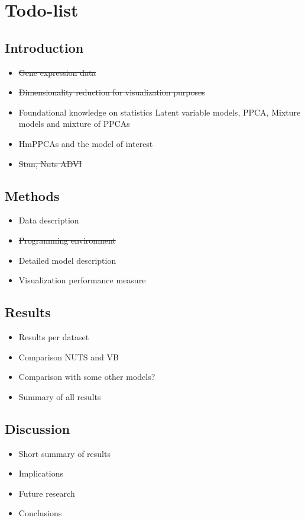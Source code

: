 \section{Todo-list}

\subsection{Introduction}
\begin{itemize}
    \item \sout{Gene expression data}
    \item \sout{Dimensionality reduction for visualization purposes}
    \item Foundational knowledge on statistics
    Latent variable models, PPCA, Mixture models and mixture of PPCAs
    \item HmPPCAs and the model of interest
    \item \sout{Stan, Nuts ADVI}
\end{itemize}

\subsection{Methods}
\begin{itemize}
    \item Data description
    \item \sout{Programming environment}
    \item Detailed model description
    \item Visualization performance measure
\end{itemize}

\subsection{Results}
\begin{itemize}
    \item Results per dataset
    \item Comparison NUTS and VB
    \item Comparison with some other models?
    \item Summary of all results
\end{itemize}

\subsection{Discussion}
\begin{itemize}
    \item Short summary of results
    \item Implications
    \item Future research
    \item Conclusions
\end{itemize}